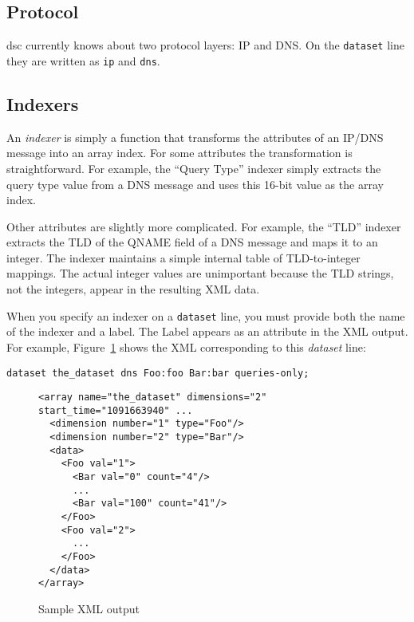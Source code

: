 \documentclass{report}
\def\dsc{{\sc dsc}}
\begin{document}
\subsection{Protocol}

{\dsc} currently knows about two protocol layers: IP and DNS.
On the {\tt dataset\/} line they are written as {\tt ip\/} and {\tt dns\/}.

\subsection{Indexers}

An {\em indexer\/} is simply a function that transforms the attributes
of an IP/DNS message into an array index.  For some attributes the
transformation is straightforward.  For example, the ``Query Type''
indexer simply extracts the query type value from a DNS message and
uses this 16-bit value as the array index.

Other attributes are slightly more complicated.  For example, the
``TLD'' indexer extracts the TLD of the QNAME field of a DNS message
and maps it to an integer.  The indexer maintains a simple internal
table of TLD-to-integer mappings.  The actual integer values are
unimportant because the TLD strings, not the integers, appear in
the resulting XML data.

When you specify an indexer on a {\tt dataset\/} line, you must
provide both the name of the indexer and a label.  The Label appears
as an attribute in the XML output.  For example,
Figure~\ref{fig-sample-xml} shows the XML corresponding to this
{\em dataset\/} line:

\begin{verbatim}
dataset the_dataset dns Foo:foo Bar:bar queries-only;
\end{verbatim}

\begin{figure}
\begin{small}\begin{verbatim}
<array name="the_dataset" dimensions="2" start_time="1091663940" ...
  <dimension number="1" type="Foo"/>
  <dimension number="2" type="Bar"/>
  <data>
    <Foo val="1">
      <Bar val="0" count="4"/>
      ...
      <Bar val="100" count="41"/>
    </Foo>
    <Foo val="2">
      ...
    </Foo>
  </data>
</array>
\end{verbatim}\end{small}
\caption{\label{fig-sample-xml}Sample XML output}
\end{figure}
\end{document}
